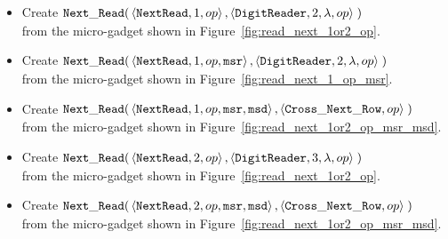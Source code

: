 \begin{itemize}

    \item Create
    $\begin{aligned}[t]
        {\tt Next\_Read}(& \left\langle {\tt NextRead},     1,          op \right\rangle,
                    \left\langle {\tt DigitReader},  2, \lambda, op \right\rangle \;)
    \end{aligned}$\\from the micro-gadget shown in Figure~\ref{fig:read_next_1or2_op}.

    \item Create
    $\begin{aligned}[t]
        {\tt Next\_Read}(& \left\langle {\tt NextRead},    1,          op, {\tt msr} \right\rangle,
                    \left\langle {\tt DigitReader}, 2, \lambda, op            \right\rangle \;)
    \end{aligned}$\\from the micro-gadget shown in Figure~\ref{fig:read_next_1_op_msr}.

    \item Create
    $\begin{aligned}[t]
        {\tt Next\_Read}(& \left\langle {\tt NextRead}, 1,      op, {\tt msr}, {\tt msd} \right\rangle,
                    \left\langle {\tt Cross\_Next\_Row}, op                       \right\rangle \;)
    \end{aligned}$\\from the micro-gadget shown in Figure~\ref{fig:read_next_1or2_op_msr_msd}.




    \item Create
    $\begin{aligned}[t]
        {\tt Next\_Read}(& \left\langle {\tt NextRead},    2,          op \right\rangle,
                    \left\langle {\tt DigitReader}, 3, \lambda, op \right\rangle \;)
    \end{aligned}$\\from the micro-gadget shown in Figure~\ref{fig:read_next_1or2_op}.

    \item Create
    $\begin{aligned}[t]
        {\tt Next\_Read}(& \left\langle {\tt NextRead}, 2,      op, {\tt msr}, {\tt msd} \right\rangle,
                    \left\langle {\tt Cross\_Next\_Row}, op                       \right\rangle \;)
    \end{aligned}$\\from the micro-gadget shown in Figure~\ref{fig:read_next_1or2_op_msr_msd}.



\end{itemize}
